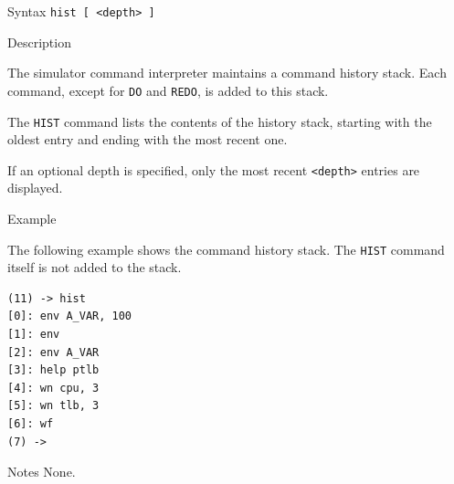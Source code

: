 %
%
\pagebreak
{}

\begin{iPageDescEntry}{Syntax}
\texttt{hist [ <depth> ]} \\
\end{iPageDescEntry}

\begin{iPageDescEntry}{Description}

The simulator command interpreter maintains a command history stack.
Each command, except for \texttt{DO} and \texttt{REDO}, is added to this stack.

The \texttt{HIST} command lists the contents of the history stack, starting
with the oldest entry and ending with the most recent one.

If an optional depth is specified, only the most recent \texttt{<depth>}
entries are displayed.

\end{iPageDescEntry}

\begin{iPageDescEntry}{Example}

The following example shows the command history stack.
The \texttt{HIST} command itself is not added to the stack.

\begin{lstlisting}[style=iPageOpStyle]
(11) -> hist
[0]: env A_VAR, 100
[1]: env
[2]: env A_VAR
[3]: help ptlb
[4]: wn cpu, 3
[5]: wn tlb, 3
[6]: wf
(7) ->
\end{lstlisting}

\end{iPageDescEntry}

\begin{iPageDescEntry}{Notes}
None.
\end{iPageDescEntry}
